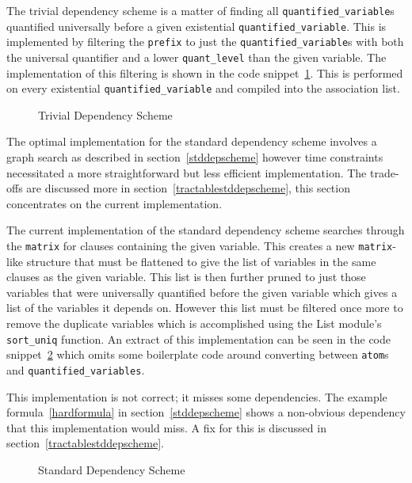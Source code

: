 The trivial dependency scheme is a matter of finding all \texttt{quantified\_variable}s quantified universally before a given existential \texttt{quantified\_variable}. This is implemented by filtering the \texttt{prefix} to just the \texttt{quantified\_variable}s with both the universal quantifier and a lower \texttt{quant\_level} than the given variable. The implementation of this filtering is shown in the code snippet~\ref{trivialdepschemeimplementation}. This is performed on every existential \texttt{quantified\_variable} and compiled into the association list.

\begin{figure}[H]
\caption{Trivial Dependency Scheme}
\label{trivialdepschemeimplementation}
\begin{CenteredBox}

\end{CenteredBox}
\end{figure}

The optimal implementation for the standard dependency scheme involves a graph search as described in section~\ref{stddepscheme} however time constraints necessitated a more straightforward but less efficient implementation. The trade-offs are discussed more in section~\ref{tractablestddepscheme}, this section concentrates on the current implementation.

The current implementation of the standard dependency scheme searches through the \texttt{matrix} for clauses containing the given variable. This creates a new \texttt{matrix}-like structure that must be flattened to give the list of variables in the same clauses as the given variable. This list is then further pruned to just those variables that were universally quantified before the given variable which gives a list of the variables it depends on. However this list must be filtered once more to remove the duplicate variables which is accomplished using the List module's \texttt{sort\_uniq} function. An extract of this implementation can be seen in the code snippet~\ref{stddepschemeimplementation} which omits some boilerplate code around converting between \texttt{atom}s and \texttt{quantified\_variables}.

This implementation is not correct; it misses some dependencies. The example formula~\ref{hardformula} in section~\ref{stddepscheme} shows a non-obvious dependency that this implementation would miss. A fix for this is discussed in section~\ref{tractablestddepscheme}.

\begin{figure}[H]
\caption{Standard Dependency Scheme}
\label{stddepschemeimplementation}
\begin{CenteredBox}

\end{CenteredBox}
\end{figure}

